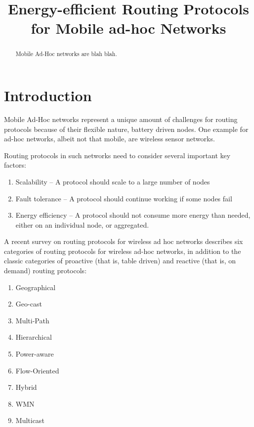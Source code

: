 \documentclass[conference]{IEEEtran}
\begin{document}
\title{Energy-efficient Routing Protocols for Mobile ad-hoc Networks}
\author{
}

\maketitle


\begin{abstract}
Mobile Ad-Hoc networks are blah blah.
\end{abstract}


\section{Introduction}
Mobile Ad-Hoc networks represent a unique amount of challenges for routing
protocols because of their flexible nature, battery driven nodes. One example
for ad-hoc networks, albeit not that mobile, are wireless sensor networks.

Routing protocols in such networks need to consider several important key
factors:
\begin{enumerate}
   \item Scalability -- A protocol should scale to a large number of nodes
   \item Fault tolerance -- A protocol should continue working if some nodes fail
   \item Energy efficiency -- A protocol should not consume more energy than needed,
   either on an individual node, or aggregated.
\end{enumerate}

A recent survey\cite{alotaibi2012survey} on routing protocols for wireless
ad hoc networks describes six categories of routing protocols for wireless
ad-hoc networks,  in addition to the classic categories of proactive (that is, table driven)
and reactive (that is, on demand) routing protocols:
\begin{enumerate}
  \item Geographical
  \item Geo-cast
  \item Multi-Path
  \item Hierarchical
  \item Power-aware
  \item Flow-Oriented
  \item Hybrid
  \item WMN
  \item Multicast
\end{enumerate}
\end{document}
